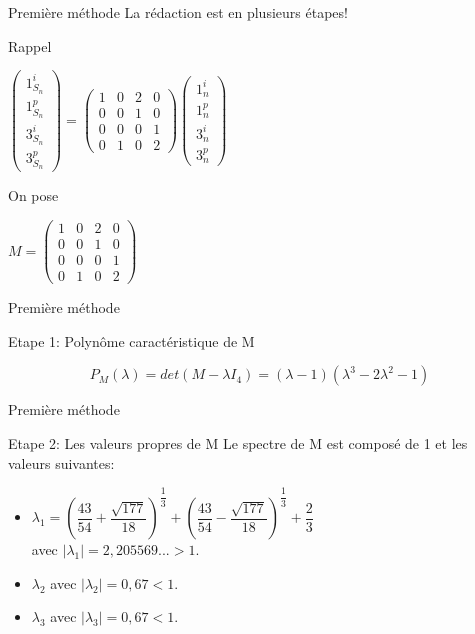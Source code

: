 \documentclass[12pt]{beamer}
\begin{document}
\begin{frame}[t]{Première méthode}
 La rédaction est en plusieurs étapes!
  \begin{block}{Rappel}
 \begin{center}
 $\left( \begin{array}{c}
1_{S_n}^i \\ 
1_{S_n}^p \\ 
3_{S_n}^i \\ 
3_{S_n}^p
\end{array} \right) = 
\left( \begin{array}{cccc}
1 & 0 & 2 & 0 \\ 
0 & 0 & 1 & 0 \\ 
0 & 0 & 0 & 1 \\ 
0 & 1 & 0 & 2
\end{array} \right)
\left( \begin{array}{c}
1_n^i \\ 
1_n^p \\ 
3_n^i \\ 
3_n^p
\end{array} \right)$
 \end{center}
  \end{block}
  On pose \begin{center}
  $M=\left( \begin{array}{cccc}
1 & 0 & 2 & 0 \\ 
0 & 0 & 1 & 0 \\ 
0 & 0 & 0 & 1 \\ 
0 & 1 & 0 & 2
\end{array} \right)$
  \end{center}
\end{frame}
\begin{frame}[t]{Première méthode}
  \begin{block}{Etape 1: Polyn\^ome caractéristique de M}

 $$P_M(\lambda)=det(M-\lambda I_4)=(\lambda-1)(\lambda^3-2\lambda^2-1)$$

  \end{block}
\end{frame}
\begin{frame}[t]{Première méthode}
  \begin{block}{Etape 2: Les valeurs propres de M}
Le spectre de M est composé de 1 et les valeurs suivantes:
\begin{itemize}
\item 
$\lambda_1=(\dfrac{43}{54}+\dfrac{\sqrt{177}}{18})^{\dfrac{1}{3}}+(\dfrac{43}{54}-\dfrac{\sqrt{177}}{18})^{\dfrac{1}{3}}+\dfrac{2}{3}$ \\ avec $|\lambda_1|=2,205569... >1$.
\item 
$\lambda_2$ avec $|\lambda_2|=0,67 < 1$.
\item 
$\lambda_3$ avec $|\lambda_3|=0,67 < 1$.
\end{itemize}
  \end{block}
\end{frame}
\end{document}
